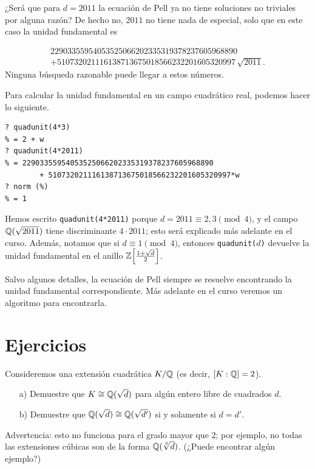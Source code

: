 ¿Será que para $d = 2011$ la ecuación de Pell ya no tiene soluciones no
triviales por alguna razón? De hecho no, $2011$ no tiene nada de especial,
solo que en este caso la unidad fundamental es

\begin{multline*}
  22903355954053525066202335319378237605968890\\
  + 510732021116138713675018566232201605320997\,\sqrt{2011}.
\end{multline*}
Ninguna búsqueda razonable puede llegar a estos números.

\begin{shaded}
  Para calcular la unidad fundamental en un campo cuadrático real, podemos hacer
  lo siguiente.
\begin{verbatim}
? quadunit(4*3)
% = 2 + w
? quadunit(4*2011)
% = 22903355954053525066202335319378237605968890
        + 510732021116138713675018566232201605320997*w
? norm (%)
% = 1
\end{verbatim}
  Hemos escrito \texttt{quadunit(4*2011)} porque $d = 2011 \equiv 2,3 \pmod{4}$,
  y el campo $\mathbb{Q} (\sqrt{2011})$ tiene discriminante $4\cdot 2011$; esto será
  explicado más adelante en el curso. Además, notamos que si
  $d \equiv 1 \pmod{4}$, entonces \texttt{quadunit($d$)} devuelve la unidad
  fundamental en el anillo $\mathbb{Z} \Bigl[\frac{1+\sqrt{d}}{2}\Bigr]$.
\end{shaded}

Salvo algunos detalles, la ecuación de Pell siempre se resuelve encontrando
la unidad fundamental correspondiente. Más adelante en el curso veremos un
algoritmo para encontrarla.

\pagebreak



\section*{Ejercicios}

\begin{ejercicio}
  Consideremos una extensión cuadrática $K/\mathbb{Q}$ (es decir, $[K : \mathbb{Q}] = 2$).

  \begin{enumerate}
  \item[a)] Demuestre que $K \cong \mathbb{Q} (\sqrt{d})$ para algún entero libre de
    cuadrados $d$.

  \item[b)] Demuestre que $\mathbb{Q} (\sqrt{d}) \cong \mathbb{Q} (\sqrt{d'})$ si y solamente
    si $d = d'$.
  \end{enumerate}

  Advertencia: esto no funciona para el grado mayor que $2$; por ejemplo,
  no todas las extensiones cúbicas son de la forma $\mathbb{Q} (\sqrt[3]{d})$.
  (¿Puede encontrar algún ejemplo?)
\end{ejercicio}

